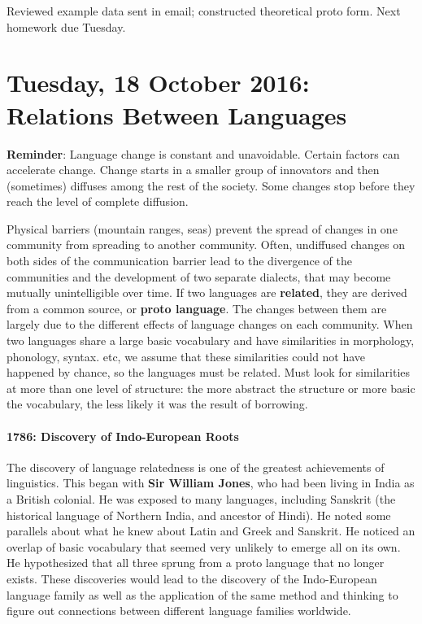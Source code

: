 \documentclass{exam}
\begin{document}
Reviewed example data sent in email; constructed theoretical proto form. Next homework due Tuesday.


\section*{Tuesday, 18 October 2016: Relations Between Languages}

\textbf{Reminder}: Language change is constant and unavoidable. Certain factors can accelerate change. Change starts in a smaller group of innovators and then (sometimes) diffuses among the rest of the society. Some changes stop before they reach the level of complete diffusion. 

Physical barriers (mountain ranges, seas) prevent the spread of changes in one community from spreading to another community. Often, undiffused changes on both sides of the communication barrier lead to the divergence of the communities and the development of two separate dialects, that may become mutually unintelligible over time. If two languages are \textbf{related}, they are derived from a common source, or \textbf{proto language}. The changes between them are largely due to the different effects of language changes on each community. When two languages share a large basic vocabulary and have similarities in morphology, phonology, syntax. etc, we assume that these similarities could not have happened by chance, so the languages must be related. Must look for similarities at more than one level of structure: the more abstract the structure or more basic the vocabulary, the less likely it was the result of borrowing. 

\paragraph{1786: Discovery of Indo-European Roots} The discovery of language relatedness is one of the greatest achievements of linguistics. This began with \textbf{Sir William Jones}, who had been living in India as a British colonial. He was exposed to many languages, including Sanskrit (the historical language of Northern India, and ancestor of Hindi). He noted some parallels about what he knew about Latin and Greek and Sanskrit. He noticed an overlap of basic vocabulary that seemed very unlikely to emerge all on its own. He hypothesized that all three sprung from a proto language that no longer exists. These discoveries would lead to the discovery of the Indo-European language family as well as the application of the same method and thinking to figure out connections between different language families worldwide. 
\end{document}
